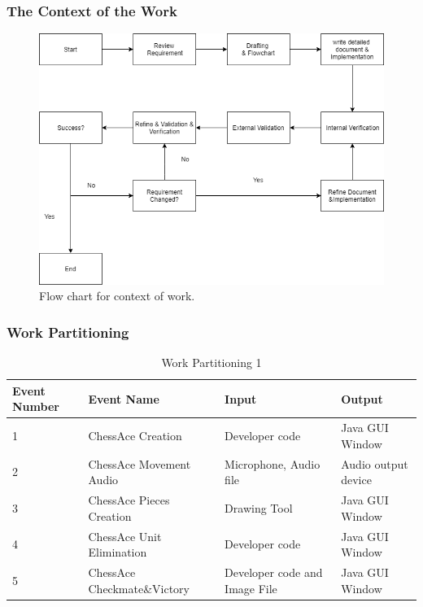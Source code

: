 \documentclass[12pt, titlepage]{article}
\begin{document}
\subsubsection{The Context of the Work}
\begin{figure}[H]
  \includegraphics[width=\linewidth]{WorkContext.png}
  \caption{Flow chart for context of work.}
  \label{fig:context}
\end{figure}

\subsubsection{Work Partitioning}
\begin{table}[H]
\footnotesize
\begin{center}
\begin{tabular}{| l | l | l | l |}
\hline
\textbf{Event Number} & \textbf{Event Name} & \textbf{Input} & \textbf{Output}\\
\hline
1 & ChessAce Creation & Developer code & Java GUI Window\\
\hline
2 & ChessAce Movement Audio & Microphone, Audio file & Audio output device\\
\hline
3 & ChessAce Pieces Creation & Drawing Tool & Java GUI Window\\
\hline
4 & ChessAce Unit Elimination & Developer code & Java GUI Window\\
\hline
5 & ChessAce Checkmate\&Victory & Developer code and Image File &  Java GUI Window\\
\hline    
\end{tabular}
\normalsize
\caption{Work Partitioning 1}
   \label{tab:table}
\end{center}
\end{table}
\end{document}
